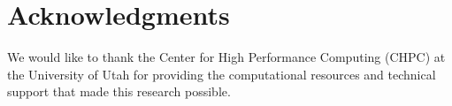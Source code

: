 \section*{Acknowledgments}

We would like to thank the Center for High Performance Computing (CHPC) at the University of Utah for providing the computational resources and technical support that made this research possible.
